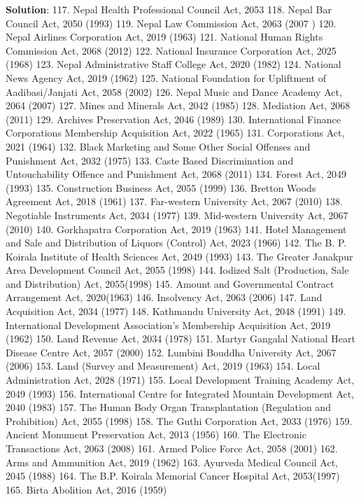 \documentclass[
  openany]{book}
\newenvironment{solution}{ {\bfseries Solution}:}{}
\begin{document}
\begin{questions}
\begin{solution}
117. Nepal Health Professional Council Act, 2053
118. Nepal Bar Council Act, 2050 (1993)
119. Nepal Law Commission Act, 2063 (2007 )
120. Nepal Airlines Corporation Act, 2019 (1963)
121. National Human Rights Commission Act, 2068 (2012)
122. National Insurance Corporation Act, 2025 (1968)
123. Nepal Administrative Staff College Act, 2020 (1982)
124. National News Agency Act, 2019 (1962)
125. National Foundation for Upliftment of Aadibasi/Janjati Act, 2058 (2002)
126. Nepal Music and Dance Academy Act, 2064 (2007)
127. Mines and Minerals Act, 2042 (1985)
128. Mediation Act, 2068 (2011)
129. Archives Preservation Act, 2046 (1989)
130. International Finance Corporations Membership Acquisition Act, 2022 (1965)
131. Corporations Act, 2021 (1964)
132. Black Marketing and Some Other Social Offenses and Punishment Act, 2032 (1975)
133. Caste Based Discrimination and Untouchability Offence and Punishment Act, 2068 (2011)
134. Forest Act, 2049 (1993)
135. Construction Business Act, 2055 (1999)
136. Bretton Woods Agreement Act, 2018 (1961)
137. Far-western University Act, 2067 (2010)
138. Negotiable Instruments Act, 2034 (1977)
139. Mid-western University Act, 2067 (2010)
140. Gorkhapatra Corporation Act, 2019 (1963)
141. Hotel Management and Sale and Distribution of Liquors (Control) Act, 2023 (1966)
142. The B. P. Koirala Institute of Health Sciences Act, 2049 (1993)
143. The Greater Janakpur Area Development Council Act, 2055 (1998)
144. Iodized Salt (Production, Sale and Distribution) Act, 2055(1998)
145. Amount and Governmental Contract Arrangement Act, 2020(1963)
146. Insolvency Act, 2063 (2006)
147. Land Acquisition Act, 2034 (1977)
148. Kathmandu University Act, 2048 (1991)
149. International Development Association’s Membership Acquisition Act, 2019 (1962)
150. Land Revenue Act, 2034 (1978)
151. Martyr Gangalal National Heart Disease Centre Act, 2057 (2000)
152. Lumbini Bouddha University Act, 2067 (2006)
153. Land (Survey and Measurement) Act, 2019 (1963)
154. Local Administration Act, 2028 (1971)
155. Local Development Training Academy Act, 2049 (1993)
156. International Centre for Integrated Mountain Development Act, 2040 (1983)
157. The Human Body Organ Transplantation (Regulation and Prohibition) Act, 2055 (1998)
158. The Guthi Corporation Act, 2033 (1976)
159. Ancient Monument Preservation Act, 2013 (1956)
160. The Electronic Transactions Act, 2063 (2008)
161. Armed Police Force Act, 2058 (2001)
162. Arms and Ammunition Act, 2019 (1962)
163. Ayurveda Medical Council Act, 2045 (1988)
164. The B.P. Koirala Memorial Cancer Hospital Act, 2053(1997)
165. Birta Abolition Act, 2016 (1959)

\end{solution}
\end{questions}
\end{document}
